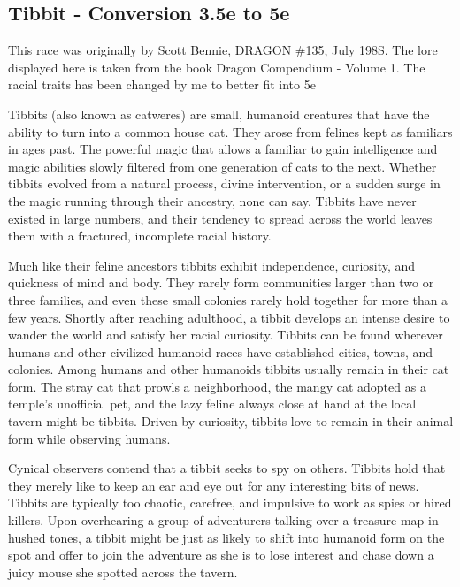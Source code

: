 \subsection{Tibbit - Conversion 3.5e to 5e}
\begin{quotebox}
This race was originally by Scott Bennie, DRAGON \#135, July 198S. The lore displayed here is taken from the book Dragon Compendium - Volume 1. The racial traits has been changed by me to better fit into 5e
\end{quotebox}


Tibbits (also known as catweres) are small, humanoid creatures that have the ability to turn into a common house cat. They arose from felines kept as familiars in ages past. The powerful magic that allows a familiar to gain intelligence and magic abilities slowly filtered from one generation of cats to the next. Whether tibbits evolved from a natural process, divine intervention, or a sudden surge in the magic running through their ancestry, none can say. Tibbits have never existed in large numbers, and their tendency to spread across the world leaves them with a fractured, incomplete racial history.

Much like their feline ancestors tibbits exhibit independence, curiosity, and quickness of mind and body. They rarely form communities larger than two or three families, and even these small colonies rarely hold together for more than a few years. Shortly after reaching adulthood, a tibbit develops an intense desire to wander the world and satisfy her racial curiosity. Tibbits can be found wherever humans and other civilized humanoid races have established cities, towns, and colonies. Among humans and other humanoids tibbits usually remain in their cat form. The stray cat that prowls a neighborhood, the mangy cat adopted as a temple's
unofficial pet, and the lazy feline always close at hand at the local tavern might be tibbits. Driven by curiosity, tibbits love to remain in their animal form while
observing humans. 

Cynical observers contend that a tibbit seeks to spy on others. Tibbits hold that they merely like to keep an ear and eye out for any interesting bits of news. Tibbits are typically too chaotic, carefree, and impulsive to work as spies or hired killers. Upon overhearing a group of adventurers talking over a treasure map in hushed tones, a tibbit might be just as likely to shift into humanoid form on the spot and offer to join the adventure as she is to lose interest and chase down a juicy mouse she spotted across the tavern. 

